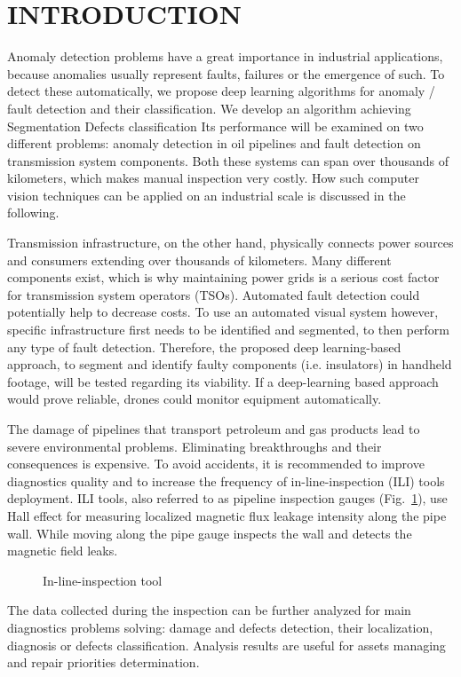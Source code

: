 \section{INTRODUCTION}
\label{INTRODUCTION}

Anomaly detection problems have a great importance in industrial applications, because anomalies usually represent faults, failures or the emergence of such. To detect these automatically, we propose deep learning algorithms for anomaly / fault detection and their classification. We develop an algorithm achieving Segmentation Defects classification Its performance will be examined on two different problems: anomaly detection in oil pipelines and fault detection on transmission system components. Both these systems can span over thousands of kilometers, which makes manual inspection very costly. How such computer vision techniques can be applied on an industrial scale is discussed in the following.

Transmission infrastructure, on the other hand, physically connects power sources and consumers extending over thousands of kilometers. Many different components exist, which is why maintaining power grids is a serious cost factor for transmission system operators (TSOs). Automated fault detection could potentially help to decrease costs. To use an automated visual system however, specific infrastructure first needs to be identified and segmented, to then perform any type of fault detection. Therefore, the proposed deep learning-based approach, to segment and identify faulty components (i.e. insulators) in handheld footage, will be tested regarding its viability. If a deep-learning based approach would prove reliable, drones could monitor equipment automatically.

The damage of pipelines that transport petroleum and gas products lead to severe environmental problems. Eliminating breakthroughs and their consequences is expensive. To avoid accidents, it is recommended to improve diagnostics quality and to increase the frequency of in-line-inspection (ILI) tools deployment. ILI tools, also referred to as pipeline inspection gauges (Fig.~\ref{ris:ili}), use Hall effect for measuring localized magnetic flux leakage intensity along the pipe wall. While moving along the pipe gauge inspects the wall and detects the magnetic field leaks.
\begin{figure}[ht]
	\caption{In-line-inspection tool}
	\label{ris:ili}
\end{figure}
The data collected during the inspection can be further analyzed for main diagnostics problems solving: damage and defects detection, their localization, diagnosis or defects classification.
Analysis results are useful for assets managing and repair priorities determination.
